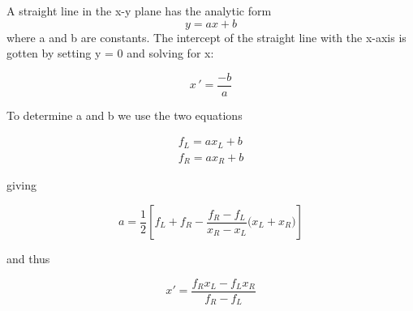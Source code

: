 A straight line in the x-y plane has the analytic form
\begin{equation}
    y = ax + b
    \label{eq:06_11}
\end{equation}
where a and b are constants. The intercept of the straight line with the x-axis is gotten by setting y = 0 and solving for x:

\begin{equation}
x\,' = \frac{-b}{a}
\end{equation}

To determine a and b we use the two equations

\begin{equation}
\begin{aligned}
f_L = ax_L + b\\
f_R = ax_R + b
\end{aligned}
\end{equation}

giving

\begin{equation}
    a = \frac{1}{2}\left [f_L + f_R - \frac{f_R - f_L}{x_R - x_L} \big (x_L + x_R \big )\right ]
\end{equation}

and thus

\begin{equation}
x' = \frac{f_Rx_L - f_Lx_R}{f_R - f_L}
\end{equation}

